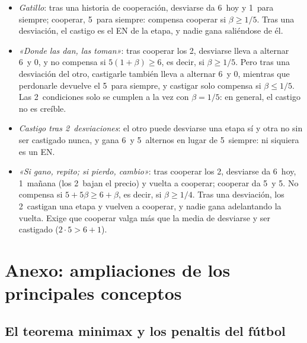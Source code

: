 \documentclass[11pt]{article}
\begin{document}
\begin{itemize}
\item \emph{Gatillo}: tras una historia de cooperación, desviarse da 6~hoy y 1~para siempre; cooperar, 5~para siempre: compensa cooperar si $\beta\geq1/5$. Tras una desviación, el castigo es el EN de la etapa, y nadie gana saliéndose de él.
\item \emph{«Donde las dan, las toman»}: tras cooperar los 2, desviarse lleva a alternar 6~y 0, y no compensa si $5(1+\beta)\geq6$, es decir, si $\beta\geq1/5$. Pero tras una desviación del otro, castigarle también lleva a alternar 6~y 0, mientras que perdonarle devuelve el 5~para siempre, y castigar solo compensa si $\beta\leq1/5$. Las 2~condiciones solo se cumplen a la vez con $\beta=1/5$: en general, el castigo no es creíble\nocite{KalaiSametStanford1988Note}.
\item \emph{Castigo tras 2~desviaciones}: el otro puede desviarse una etapa sí y otra no sin ser castigado nunca, y gana 6~y 5~alternos en lugar de 5~siempre: ni siquiera es un EN.
\item \emph{«Si gano, repito; si pierdo, cambio»}: tras cooperar los 2, desviarse da 6~hoy, 1~mañana (los 2~bajan el precio) y vuelta a cooperar; cooperar da 5~y 5. No compensa si $5+5\beta\geq6+\beta$, es decir, si $\beta\geq1/4$. Tras una desviación, los 2~castigan una etapa y vuelven a cooperar, y nadie gana adelantando la vuelta. Exige que cooperar valga más que la media de desviarse y ser castigado ($2\cdot5>6+1$).
\end{itemize}


\section{Anexo: ampliaciones de los principales conceptos}\label{anexo:conceptos}

\subsection*{El teorema minimax y los penaltis del fútbol}
\end{document}
